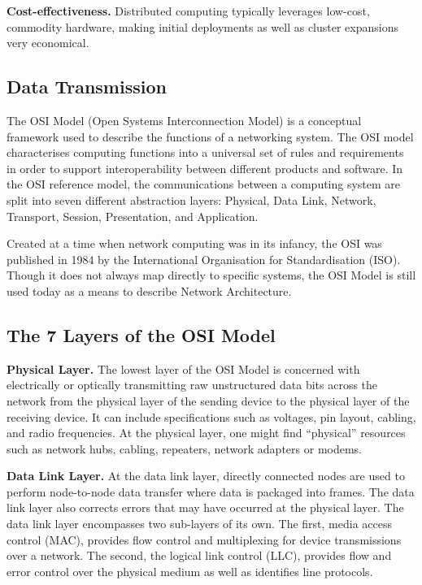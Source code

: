 \documentclass[../report.tex]{subfiles}
\begin{document}
\textbf{Cost-effectiveness.} Distributed computing typically leverages low-cost, commodity hardware, making initial deployments as well as cluster expansions very economical.


\pagebreak

\subsection{Data Transmission} %

The OSI Model (Open Systems Interconnection Model) is a conceptual framework used to describe the functions of a networking system. The OSI model characterises computing functions into a universal set of rules and requirements in order to support interoperability between different products and software. In the OSI reference model, the communications between a computing system are split into seven different abstraction layers: Physical, Data Link, Network, Transport, Session, Presentation, and Application.

Created at a time when network computing was in its infancy, the OSI was published in 1984 by the International Organisation for Standardisation (ISO). Though it does not always map directly to specific systems, the OSI Model is still used today as a means to describe Network Architecture.

\subsection{The 7 Layers of the OSI Model}

\textbf{Physical Layer.} The lowest layer of the OSI Model is concerned with electrically or optically transmitting raw unstructured data bits across the network from the physical layer of the sending device to the physical layer of the receiving device. It can include specifications such as voltages, pin layout, cabling, and radio frequencies. At the physical layer, one might find “physical” resources such as network hubs, cabling, repeaters, network adapters or modems.

\textbf{Data Link Layer.} At the data link layer, directly connected nodes are used to perform node-to-node data transfer where data is packaged into frames. The data link layer also corrects errors that may have occurred at the physical layer. The data link layer encompasses two sub-layers of its own. The first, media access control (MAC), provides flow control and multiplexing for device transmissions over a network. The second, the logical link control (LLC), provides flow and error control over the physical medium as well as identifies line protocols.
\end{document}
